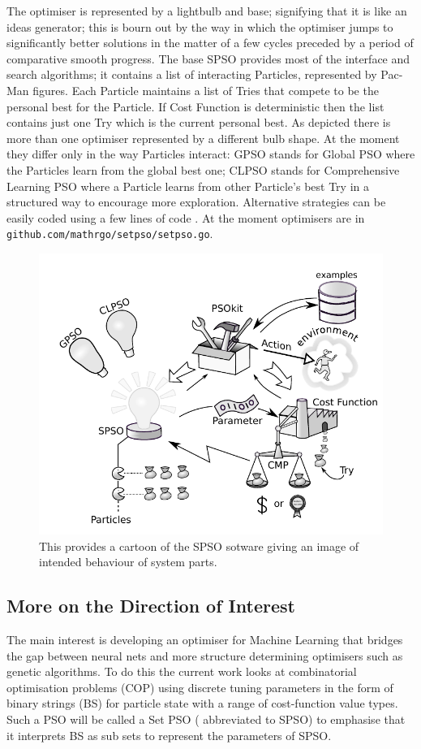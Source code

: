 \documentclass[a4paper,oneside,english]{book}
\numberwithin{equation}{section}
\numberwithin{figure}{section}
\newcommand{\codesorc}[1]{\texttt{github.com/mathrgo/setpso/#1}}
\begin{document}
	The optimiser is represented by a lightbulb and base; signifying that it is like an ideas generator; this is bourn out by the way in which the optimiser jumps to significantly better solutions in the matter of a few cycles preceded by a period of comparative smooth progress. The base SPSO provides most of the interface and search algorithms; it contains a list of interacting Particles, represented by Pac-Man figures. Each Particle maintains a list of Tries that compete to be the personal best for the Particle. If  Cost Function is deterministic then the list contains just one Try which is the current personal best. As depicted there is more than one optimiser represented by a different bulb shape. At the moment they differ only in the way Particles interact: GPSO stands for Global PSO where the Particles learn from the global best one; CLPSO stands for Comprehensive Learning PSO where a Particle learns from other Particle's best Try in a structured way to encourage more exploration. Alternative strategies can be easily coded using a few lines of code . At the moment optimisers are in \codesorc{setpso.go}.   
\begin{figure}
	\centering
	\includegraphics{"SPSO overview"}
	\caption[SPSO over view]{This provides a cartoon of the SPSO sotware giving an image of intended behaviour of  system parts.}
	\label{fig:spso-overview}
\end{figure}

\subsection{More on the Direction of Interest}
The main interest is developing an optimiser for Machine Learning that bridges the gap between neural nets and more structure determining optimisers such as genetic algorithms. To do this the current work looks at combinatorial optimisation problems (COP) using discrete tuning parameters in the form of binary strings (BS) for particle state with a range of cost-function value types. Such  a PSO will be called a Set PSO ( abbreviated to SPSO) to emphasise that it interprets BS as  sub sets to represent the parameters of SPSO. 
\end{document}
